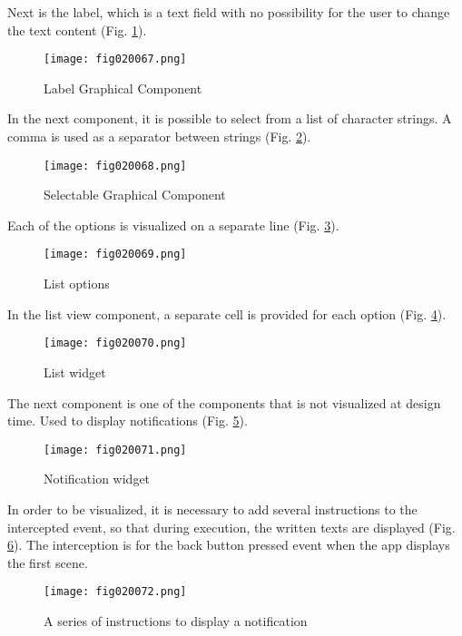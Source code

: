 Next is the label, which is a text field with no possibility for the user to change the text content (Fig. \ref{fig020067}).

\begin{figure}[H]
   \centering
   \texttt{[image: fig020067.png]}
   \caption{Label Graphical Component}
\label{fig020067}
\end{figure}

In the next component, it is possible to select from a list of character strings. A comma is used as a separator between strings (Fig. \ref{fig020068}).

\begin{figure}[H]
   \centering
   \texttt{[image: fig020068.png]}
   \caption{Selectable Graphical Component}
\label{fig020068}
\end{figure}

Each of the options is visualized on a separate line (Fig. \ref{fig020069}).

\begin{figure}[H]
   \centering
   \texttt{[image: fig020069.png]}
   \caption{List options}
\label{fig020069}
\end{figure}

In the list view component, a separate cell is provided for each option (Fig. \ref{fig020070}).

\begin{figure}[H]
   \centering
   \texttt{[image: fig020070.png]}
   \caption{List widget}
\label{fig020070}
\end{figure}

The next component is one of the components that is not visualized at design time. Used to display notifications (Fig. \ref{fig020071}).

\begin{figure}[H]
   \centering
   \texttt{[image: fig020071.png]}
   \caption{Notification widget}
\label{fig020071}
\end{figure}

In order to be visualized, it is necessary to add several instructions to the intercepted event, so that during execution, the written texts are displayed (Fig. \ref{fig020072}). The interception is for the back button pressed event when the app displays the first scene.

\begin{figure}[H]
   \centering
   \texttt{[image: fig020072.png]}
   \caption{A series of instructions to display a notification}
\label{fig020072}
\end{figure}

